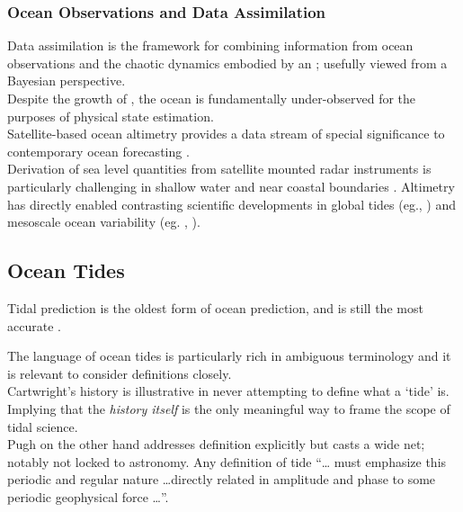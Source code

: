 \subsubsection{Ocean Observations and Data Assimilation}
Data assimilation is the framework for combining information from ocean observations and the chaotic dynamics embodied by an \OGCM{}; usefully viewed from a Bayesian perspective\citep{Zaron:2011ft}.\\
Despite the growth of \GOOS{} \citep{Komen:1999ch}, the ocean is fundamentally under-observed for the purposes of physical state estimation.\\



Satellite-based ocean altimetry provides a data stream of special significance to contemporary ocean forecasting \citep{Fu:2001ub}. \\
Derivation of sea level quantities from satellite mounted radar instruments is particularly challenging in shallow water and near coastal boundaries \citep{Woodworth:2011bf}. 
Altimetry has directly enabled contrasting scientific developments in global tides (eg.\citet{Egbert:1996vr},  \citet{Lefevre:2011dg}) and mesoscale ocean variability (eg.  \citet{Wunsch:1998bq}, \citet{Chelton:vi}).

 
\newpage
\subsection{Ocean Tides}
\label{S:TIDE}

\BoxBegin
Tidal prediction is the oldest form of ocean prediction, and is still the most accurate \citep{Parker:2007wq}. \\
\BoxEnd

The language of ocean tides is particularly rich in ambiguous terminology and it is relevant to consider definitions closely.\\ 
Cartwright's \cite{Cartwright:2000tt} history is illustrative in never attempting to define what a `tide' is.  Implying that the \emph{history itself} is the only meaningful way to frame the scope of tidal science.\\
Pugh \cite{Pugh:1996uz} on the other hand addresses definition explicitly but casts a wide net; notably not locked to astronomy.  Any definition of tide ``\dots{} must emphasize this periodic and regular nature \dots directly related in amplitude and phase to some periodic geophysical force \dots''.\\

